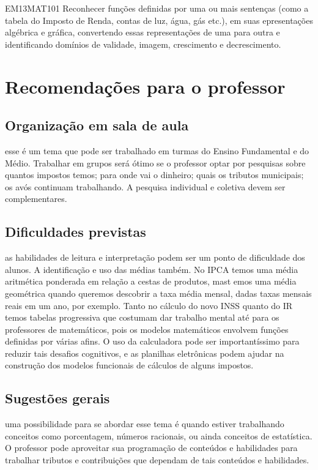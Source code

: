 \begin{paginatexto}
\begin{habilities}{EM13MAT101}
Reconhecer funções definidas por uma ou mais sentenças (como a tabela do Imposto de Renda, contas de luz, água, gás etc.), em suas epresentações algébrica e gráfica, convertendo essas representações de uma para outra e identificando domínios de validade, imagem, crescimento e decrescimento.
\end{habilities}

\section*{Recomendações para o professor}

\subsection{Organização em sala de aula} esse é um tema que pode ser trabalhado em turmas do Ensino Fundamental e do Médio. Trabalhar em grupos será ótimo se o professor optar por pesquisas sobre quantos impostos temos; para onde vai o dinheiro; quais os tributos municipais; os avós continuam trabalhando. A pesquisa individual e coletiva devem ser complementares.

\subsection{Dificuldades previstas} as habilidades de leitura e interpretação podem ser um ponto de dificuldade dos alunos. A identificação e uso das médias também. No IPCA temos uma média aritmética ponderada em relação a cestas de produtos, mast emos uma média geométrica quando queremos descobrir a taxa média mensal, dadas taxas mensais reais em um ano, por exemplo. Tanto no cálculo do novo INSS quanto do IR temos tabelas progressiva que costumam dar trabalho mental até para os professores de matemáticos, pois os modelos matemáticos envolvem funções definidas por várias afins. O uso da calculadora pode ser importantíssimo para reduzir tais desafios cognitivos, e as planilhas eletrônicas podem ajudar na construção dos modelos funcionais de cálculos de alguns impostos.

\subsection{Sugestões gerais} uma possibilidade para se abordar esse tema é quando estiver trabalhando conceitos como porcentagem, números racionais, ou ainda conceitos de estatística. O professor pode aproveitar sua programação de conteúdos e habilidades para trabalhar tributos e contribuições que dependam de tais conteúdos e habilidades.


\end{paginatexto}
